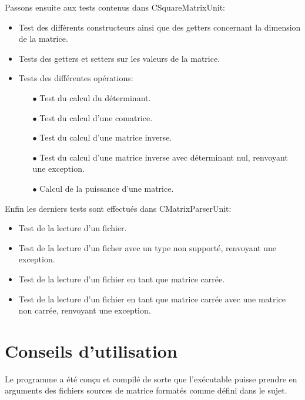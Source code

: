		Passons ensuite aux tests contenus dans CSquareMatrixUnit:
		\begin{itemize}
			\item Test des différents constructeurs ainsi que des getters concernant la dimension de la matrice.
			\item Tests des getters et setters sur les valeurs de la matrice.
			\item Tests des différentes opérations:
			\begin{itemize}
				\item[$\bullet$] Test du calcul du déterminant.
				\item[$\bullet$] Test du calcul d'une comatrice.
				\item[$\bullet$] Test du calcul d'une matrice inverse.
				\item[$\bullet$] Test du calcul d'une matrice inverse avec déterminant nul, renvoyant une exception.
				\item[$\bullet$] Calcul de la puissance d'une matrice.\\
			\end{itemize}
		\end{itemize}
		
		Enfin les derniers tests sont effectués dans CMatrixParserUnit:
		\begin{itemize}
			\item Test de la lecture d'un fichier.
			\item Test de la lecture d'un ficher avec un type non supporté, renvoyant une exception.
			\item Test de la lecture d'un fichier en tant que matrice carrée.
			\item Test de la lecture d'un fichier en tant que matrice carrée avec une matrice non carrée, renvoyant une exception.
		\end{itemize}
	
	\chapter{Conseils d'utilisation}
	Le programme a été conçu et compilé de sorte que l'exécutable puisse prendre en arguments des fichiers sources de matrice formatés comme défini dans le sujet.
	
